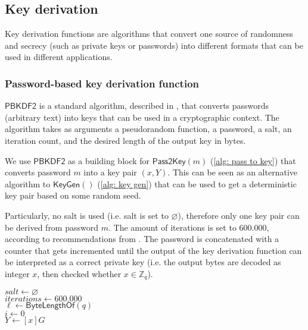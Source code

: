 \clearpage
\subsection{Key derivation} \label{app: key derivation}
Key derivation functions are algorithms that convert one source of randomness and secrecy (such as private keys or passwords) into different formats that can be used in different applications.


\subsubsection{Password-based key derivation function} \label{app: password-based key derivation function}
$\mathsf{PBKDF2}$ is a standard algorithm, described in \cite{RFC8018}, that converts passwords (arbitrary text) into keys that can be used in a cryptographic context. The algorithm takes as arguments a pseudorandom function, a password, a salt, an iteration count, and the desired length of the output key in bytes.

We use $\mathsf{PBKDF2}$ as a building block for $\mathsf{Pass2Key}(m)$ (\cref{alg: pass to key}) that converts password $m$ into a key pair $(x, Y)$. This can be seen as an alternative algorithm to $\mathsf{KeyGen}()$ (\cref{alg: key gen}) that can be used to get a deterministic key pair based on some random seed.

Particularly, no salt is used (i.e. salt is set to $\varnothing$), therefore only one key pair can be derived from password $m$. The amount of iterations is set to 600.000, according to recommendations from \cite{OWASP}. The password is concatenated with a counter that gets incremented until the output of the key derivation function can be interpreted as a correct private key (i.e. the output bytes are decoded as integer $x$, then checked whether $x \in \mathbb{Z}_q$).

\begin{algorithm}[ht]
    \DontPrintSemicolon
    \caption{$\mathsf{Pass2Key}(m)$}
    \label{alg: pass to key}
    
    $salt \gets \varnothing$ \\
    $iterations \gets 600.000$ \\
    $\ell \gets \mathsf{ByteLengthOf}(q)$ \\
    $i \gets 0$ \\
    $Y \gets [x]G$ \\
     
\end{algorithm}


